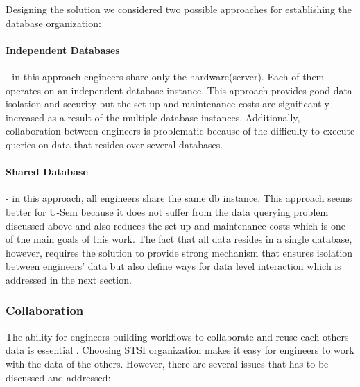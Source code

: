 Designing the solution we considered two possible approaches for establishing the database organization:

\paragraph{Independent Databases} - in this approach engineers share only the hardware(server). Each of them operates on an independent database instance. This approach provides good data isolation and security but the set-up and maintenance costs are significantly increased as a result of the multiple database instances. Additionally, collaboration between engineers is problematic because of the difficulty to execute queries on data that resides over several databases.  
	
\paragraph{Shared Database} - in this approach, all engineers share the same db instance. This approach seems better for U-Sem because it does not suffer from the data querying problem discussed above and also reduces the set-up and maintenance costs which is one of the main goals of this work. The fact that all data resides in a single database, however, requires the solution to provide strong mechanism that ensures isolation between engineers' data but also define ways for data level interaction which is addressed in the next section.


\subsubsection{Collaboration}
The ability for engineers building workflows to collaborate and reuse each others data is essential \cite{lu2009collaborative}. Choosing STSI organization makes it easy for engineers to work with the data of the others. However, there are several issues that has to be discussed and addressed:

